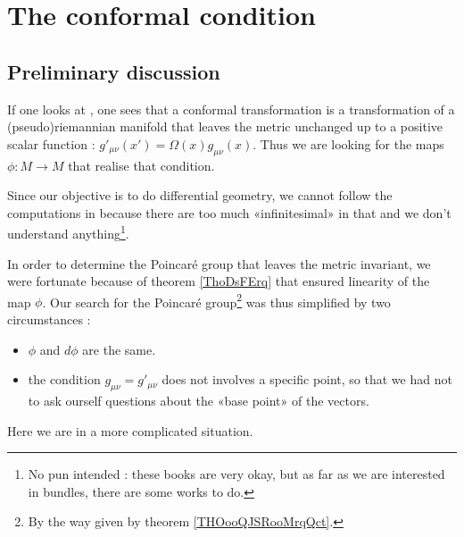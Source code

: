 
\section{The conformal condition}

\subsection{Preliminary discussion}

If one looks at \cite{ooIYOHooMRMfXl,ooDPRUooOFPyPH}, one sees that a conformal transformation is a transformation of a (pseudo)riemannian manifold that leaves the metric unchanged up to a positive scalar function : \( g'_{\mu\nu}(x')=\Omega(x)g_{\mu\nu}(x)\). Thus we are looking for the maps \( \phi\colon M\to M\) that realise that condition.

Since our objective is to do differential geometry, we cannot follow the computations in \cite{ooIYOHooMRMfXl,ooDPRUooOFPyPH} because there are too much «infinitesimal» in that and we don't understand anything\footnote{No pun intended : these books are very okay, but as far as we are interested in bundles, there are some works to do.}.

In order to determine the Poincaré group that leaves the metric invariant, we were fortunate because of theorem \ref{ThoDsFErq} that ensured linearity of the map \( \phi\). Our search for the Poincaré group\footnote{By the way given by theorem \ref{THOooQJSRooMrqQct}.} was thus simplified by two circumstances :
\begin{itemize}
    \item \( \phi\) and \( d\phi\) are the same.
    \item the condition \( g_{\mu\nu}=g'_{\mu\nu}\) does not involves a specific point, so that we had not to ask ourself questions about the «base point» of the vectors.
\end{itemize}
Here we are in a more complicated situation. 

